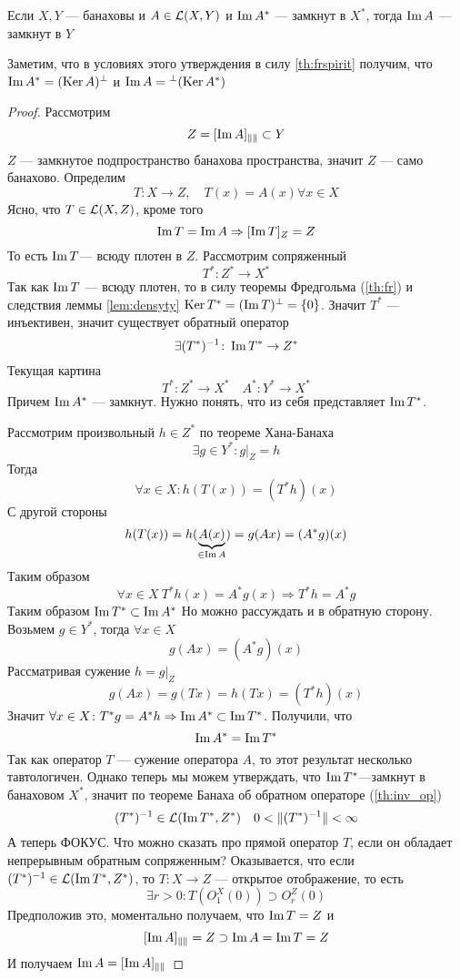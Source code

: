 \begin{claim} \label{cl:frspirit}
	Если $X,Y$ --- банаховы и $A \in \mathcal{L}(X,Y)$ и $\operatorname{Im} A^*$ --- замкнут в $X^*$, тогда $\operatorname{Im} A$ --- замкнут в $Y$
\end{claim}
Заметим, что в условиях этого утверждения в силу \ref{th:frspirit} получим, что $\operatorname{Im} A^* = (\operatorname{Ker} A)^\perp$ и $\operatorname{Im} A = {}^\perp(\operatorname{Ker} A^*)$
\begin{proof}
	Рассмотрим
	$$
	Z = [\operatorname{Im} A]_{\|\|} \subset Y
	$$
	$Z$ --- замкнутое подпространство банахова пространства, значит $Z$ --- само банахово. Определим
	$$
	T \colon X \to Z, \quad T(x)  = A(x) \forall x\in X 
	$$
	Ясно, что $T \in \mathcal{L}(X,Z)$, кроме того 
	$$
	\operatorname{Im} T = \operatorname{Im} A \Rightarrow [\operatorname{Im} T]_{Z}  = Z 
	$$
	То есть $\operatorname{Im} T$--- всюду плотен в $Z$. Рассмотрим сопряженный
	$$
	T^* \colon Z^* \to X^*
	$$
	Так как $\operatorname{Im} T$ --- всюду плотен, то в силу теоремы Фредгольма (\ref{th:fr}) и следствия леммы \ref{lem:densyty} $\operatorname{Ker} T^* = (\operatorname{Im} T)^\perp = \{0\}$. Значит $T^*$ --- инъективен, значит существует обратный оператор
	$$
	\exists (T^*)^{-1}\colon \operatorname{Im} T^* \to Z^*
	$$
	Текущая картина
	$$
	T^* \colon Z^* \to X^* \quad A^* \colon Y^* \to X^* 
	$$
	Причем $\operatorname{Im} A^*$ --- замкнут. Нужно понять, что из себя представляет $\operatorname{Im} T^*$. 
	
	Рассмотрим произвольный $h \in Z^*$ по теореме Хана-Банаха 
	$$
	\exists g \in Y^*\colon g\big|_{Z}= h
	$$
	Тогда 
	$$
	\forall x \in X\colon h(T(x)) = (T^*h)(x)
	$$
	С другой стороны 
	$$
	h(T(x))  = h(\underbrace{A(x)}_{\in \operatorname{Im} A})  = g(Ax)  = (A^*g)(x)
	$$
	Таким образом
	$$
	\forall x \in X\  T^*h(x) = A^*g(x) \Rightarrow T^*h = A^* g
	$$
	Таким образом $ \operatorname{Im} T^* \subset \operatorname{Im} A^*$
	Но можно рассуждать и в обратную сторону. Возьмем $g \in Y^*$, тогда $\forall x \in X$
	$$
	g(Ax) = (A^*g)(x)
	$$
	Рассматривая сужение $h = g\big|_Z$
	$$
	g(Ax) = g(Tx) = h(Tx) = (T^*h)(x)
	$$
	Значит $\forall x \in X \colon T^*g = A^*h \Rightarrow \operatorname{Im} A^* \subset \operatorname{Im} T^*$. Получили, что
	$$
	\operatorname{Im} A^* = \operatorname{Im} T^*
	$$
	Так как оператор $T$ --- сужение оператора $A$, то этот результат несколько тавтологичен. Однако теперь мы можем утверждать, что $\operatorname{Im} T^*$---замкнут в банаховом $X^*$, значит по теореме Банаха об обратном операторе (\ref{th:inv_op}) 
	$$
	(T^*)^{-1} \in \mathcal{L}(\operatorname{Im} T^*, Z^*) \quad 0< \|(T^*)^{-1}\| < \infty
	$$
	А теперь ФОКУС. Что можно сказать про прямой оператор $T$, если он обладает непрерывным обратным сопряженным?
	Оказывается, что если $(T^*)^{-1} \in \mathcal{L}(\operatorname{Im} T^*, Z^*)$, то $T \colon X \to Z$ --- открытое отображение, то есть 
	$$
	\exists r>0 \colon T(O_1^X(0)) \supset O_r^Z(0)
	$$
	Предположив это, моментально получаем, что $\operatorname{Im} T = Z$ и 
	$$
	[\operatorname{Im} A]_{\|\|} = Z \supset \operatorname{Im} A = \operatorname{Im} T = Z 
	$$
	И получаем $\operatorname{Im} A = [\operatorname{Im} A]_{\|\|}$
	

\end{proof}

